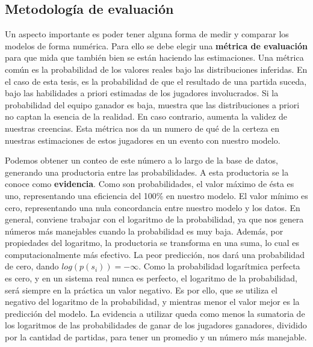 \documentclass[11pt,twoside,spanish]{report} %
\begin{document}


\subsection{Metodolog\'ia de evaluaci\'on}

Un aspecto importante es poder tener alguna forma de medir y comparar los modelos de forma num\'erica.
Para ello se debe elegir una \textbf{m\'etrica de evaluaci\'on} para que mida que tambi\'en bien se est\'an haciendo las estimaciones.
Una m\'etrica com\'un es la probabilidad de los valores reales bajo las distribuciones inferidas.
En el caso de esta tesis, es la probabilidad de que el resultado de una partida suceda, bajo las habilidades a priori estimadas de los jugadores involucrados.
Si la probabilidad del equipo ganador es baja, muestra que las distribuciones a priori no captan la esencia de la realidad.
En caso contrario, aumenta la validez de nuestras creencias.
Esta m\'etrica nos da un numero de qu\'e de la certeza en nuestras estimaciones de estos jugadores en un evento con nuestro modelo.

Podemos obtener un conteo de este n\'umero a lo largo de la base de datos, generando una productoria entre las probabilidades.
A esta productoria se la conoce como \textbf{evidencia}. %
Como son probabilidades, el valor m\'aximo de \'esta es uno, representando una eficiencia del 100\% en nuestro modelo.
El valor m\'inimo es cero, representando una nula concordancia entre nuestro modelo y los datos.
En general, conviene trabajar con el logaritmo de la probabilidad, ya que nos genera n\'umeros m\'as manejables cuando la probabilidad es muy baja.
Adem\'as, por propiedades del logaritmo, la productoria se transforma en una suma, lo cual es  computacionalmente m\'as efectivo.
La peor predicci\'on, nos dar\'a una probabilidad de cero, dando $log(p(s_i))=-\infty$.
Como la probabilidad logar\'itmica perfecta es cero, y en un sistema real nunca es perfecto, el logaritmo de la probabilidad, ser\'a siempre en la pr\'actica un valor negativo.
Es por ello, que se utiliza el negativo del logaritmo de la probabilidad, y mientras menor el valor mejor es la predicci\'on del modelo.
La evidencia a utilizar queda como menos la sumatoria de los logaritmos de las probabilidades de ganar de los jugadores ganadores, dividido por la cantidad de partidas, para tener un promedio y un n\'umero m\'as manejable.
\end{document}
